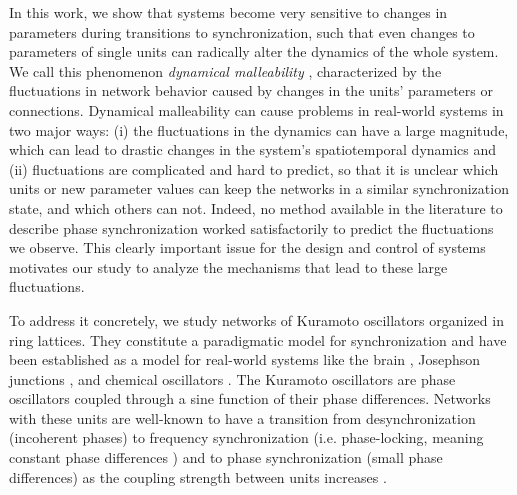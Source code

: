 In this work, we show that systems become very sensitive to changes in parameters during transitions to synchronization, such that even changes to parameters of single units can radically alter the dynamics of the whole system.
We call this phenomenon \textit{dynamical malleability} \cite{budzinski2020synchronization}, characterized by the fluctuations in network behavior caused by changes in the units' parameters or connections. Dynamical malleability can cause problems in real-world systems in two major ways: (i) the fluctuations in the dynamics can have a large magnitude, which can lead to drastic changes in the system's spatiotemporal dynamics and (ii) fluctuations are complicated and hard to predict, so that it is unclear which units or new parameter values can keep the networks in a similar synchronization state, and which others can not. Indeed, no method available in the literature to describe phase synchronization worked satisfactorily to predict the fluctuations we observe. This clearly important issue for the design and control of systems motivates our study to analyze the mechanisms that lead to these large fluctuations. 

To address it concretely, we study networks of Kuramoto oscillators organized in ring lattices. They constitute a paradigmatic model for synchronization \cite{kuramoto1975self,acebron2005kuramoto,rodrigues2016the} and have been established as a model for real-world systems like the brain \cite{poncealvarez2015restingstate, cabral2011role, rodrigues2016the}, Josephson junctions \cite{josephson1964coupled, crotty2010josephson}, and chemical oscillators \cite{marek1975synchronization, neu1979chemical}.  The Kuramoto oscillators are phase oscillators coupled through a sine function of their phase differences. Networks with these units are well-known to have a transition from desynchronization (incoherent phases) to frequency synchronization (i.e. phase-locking, meaning constant phase differences \cite{pikovsky2001synchronization}) and to phase synchronization (small phase differences) \cite{rosenblum1996phase} as the coupling strength between units increases \cite{rodrigues2016the, acebron2005kuramoto}. 

